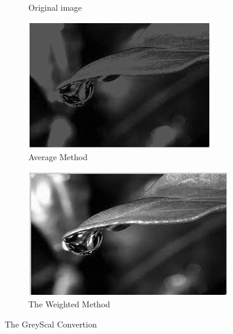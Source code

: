 \begin{enumerate}
\begin{figure}[h]
\begin{subfigure}[b]{0.3\textwidth}
                                \caption{Original image}
                        \end{subfigure}
                        \hfill
                        \begin{subfigure}[b]{0.3\textwidth}
                                \centering
                                \includegraphics[width=\textwidth]{chapiter1/figures/avarage-grey.png}
                                \caption{Average Method}
                        \end{subfigure}
                        \hfill
                        \begin{subfigure}[b]{0.3\textwidth}
                                \centering
                                \includegraphics[width=\textwidth]{chapiter1/figures/withed-grey.png}
                                \caption{The Weighted Method}
                        \end{subfigure}
                        \caption{The GreyScal Convertion }
                \end{figure}
        \end{enumerate}
